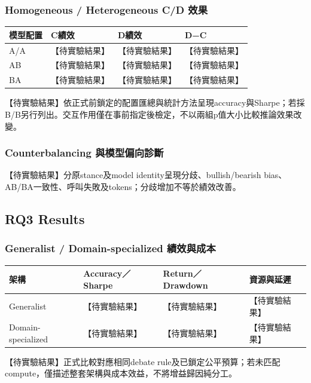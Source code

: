 \documentclass[12pt,a4paper]{article}
\begin{document}
\begin{CJK}{UTF8}{bkai}
\subsubsection{Homogeneous / Heterogeneous C/D 效果}
\begin{table}[H]\centering\small
\begin{tabularx}{\textwidth}{@{}lYYY@{}}\toprule
模型配置 & C績效 & D績效 & D−C\\
\midrule
A/A & 【待實驗結果】 & 【待實驗結果】 & 【待實驗結果】\\
AB & 【待實驗結果】 & 【待實驗結果】 & 【待實驗結果】\\
BA & 【待實驗結果】 & 【待實驗結果】 & 【待實驗結果】\\\bottomrule\end{tabularx}\end{table}
【待實驗結果】依正式前鎖定的配置匯總與統計方法呈現accuracy與Sharpe；若採B/B另行列出。交互作用僅在事前指定後檢定，不以兩組p值大小比較推論效果改變。

\subsubsection{Counterbalancing 與模型偏向診斷}
【待實驗結果】分原stance及model identity呈現分歧、bullish/bearish bias、AB/BA一致性、呼叫失敗及tokens；分歧增加不等於績效改善。

\subsection{RQ3 Results}

\subsubsection{Generalist / Domain-specialized 績效與成本}
\begin{table}[H]\centering\small
\begin{tabularx}{\textwidth}{@{}lYYY@{}}\toprule
架構 & Accuracy／Sharpe & Return／Drawdown & 資源與延遲\\
\midrule
Generalist & 【待實驗結果】 & 【待實驗結果】 & 【待實驗結果】\\
Domain-specialized & 【待實驗結果】 & 【待實驗結果】 & 【待實驗結果】\\\bottomrule\end{tabularx}\end{table}
【待實驗結果】正式比較對應相同debate rule及已鎖定公平預算；若未匹配compute，僅描述整套架構與成本效益，不將增益歸因純分工。


\end{CJK}
\end{document}
